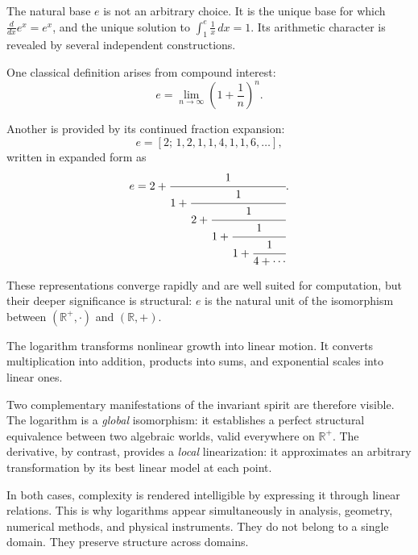 \medskip

The natural base $e$ is not an arbitrary choice.
It is the unique base for which $\frac{d}{dx}e^x = e^x$,
and the unique solution to $\int_1^e \frac{1}{x}\,dx = 1$.
Its arithmetic character is revealed by several independent constructions.

\medskip

One classical definition arises from compound interest:
\[
e = \lim_{n\to\infty}\left(1+\frac{1}{n}\right)^n.
\]

Another is provided by its continued fraction expansion:
\[
e = [2;\,1,2,1,1,4,1,1,6,\dots],
\]
written in expanded form as
\[
e
=
2 + \cfrac{1}{1 + \cfrac{1}{2 + \cfrac{1}{1 + \cfrac{1}{1 + \cfrac{1}{4 + \cdots}}}}}.
\]

These representations converge rapidly and are well suited for computation,
but their deeper significance is structural:
$e$ is the natural unit of the isomorphism between $(\mathbb{R}^+,\cdot)$
and $(\mathbb{R},+)$.


\medskip

The logarithm transforms nonlinear growth into linear motion.
It converts multiplication into addition, products into sums,
and exponential scales into linear ones.

\medskip

Two complementary manifestations of the invariant spirit are therefore visible.
The logarithm is a \emph{global} isomorphism:
it establishes a perfect structural equivalence between two algebraic worlds,
valid everywhere on $\mathbb{R}^+$.
The derivative, by contrast, provides a \emph{local} linearization:
it approximates an arbitrary transformation by its best linear model at each point.

\medskip

In both cases, complexity is rendered intelligible by expressing it through
linear relations.
This is why logarithms appear simultaneously in analysis, geometry, numerical
methods, and physical instruments.
They do not belong to a single domain.
They preserve structure across domains.